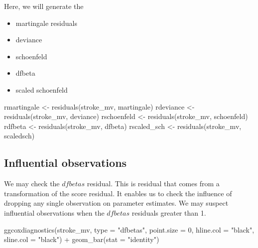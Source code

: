 \documentclass[
  10pt,
]{krantz}
\newenvironment{Shaded}{\begin{snugshade}}{\end{snugshade}}
\newcommand{\AttributeTok}[1]{\textcolor[rgb]{0.77,0.63,0.00}{#1}}
\newcommand{\DecValTok}[1]{\textcolor[rgb]{0.00,0.00,0.81}{#1}}
\newcommand{\FunctionTok}[1]{\textcolor[rgb]{0.00,0.00,0.00}{#1}}
\newcommand{\NormalTok}[1]{#1}
\newcommand{\OtherTok}[1]{\textcolor[rgb]{0.56,0.35,0.01}{#1}}
\newcommand{\SpecialCharTok}[1]{\textcolor[rgb]{0.00,0.00,0.00}{#1}}
\newcommand{\StringTok}[1]{\textcolor[rgb]{0.31,0.60,0.02}{#1}}
\providecommand{\tightlist}{%
  \setlength{\itemsep}{0pt}\setlength{\parskip}{0pt}}
\begin{document}
Here, we will generate the

\begin{itemize}
\tightlist
\item
  martingale residuals
\item
  deviance
\item
  schoenfeld
\item
  dfbeta
\item
  scaled schoenfeld
\end{itemize}

\begin{Shaded}
\begin{Highlighting}[]
\NormalTok{rmartingale }\OtherTok{\textless{}{-}} \FunctionTok{residuals}\NormalTok{(stroke\_mv, }\StringTok{\textquotesingle{}martingale\textquotesingle{}}\NormalTok{)}
\NormalTok{rdeviance }\OtherTok{\textless{}{-}} \FunctionTok{residuals}\NormalTok{(stroke\_mv, }\StringTok{\textquotesingle{}deviance\textquotesingle{}}\NormalTok{)}
\NormalTok{rschoenfeld }\OtherTok{\textless{}{-}} \FunctionTok{residuals}\NormalTok{(stroke\_mv, }\StringTok{\textquotesingle{}schoenfeld\textquotesingle{}}\NormalTok{)}
\NormalTok{rdfbeta }\OtherTok{\textless{}{-}} \FunctionTok{residuals}\NormalTok{(stroke\_mv, }\StringTok{\textquotesingle{}dfbeta\textquotesingle{}}\NormalTok{)}
\NormalTok{rscaled\_sch }\OtherTok{\textless{}{-}} \FunctionTok{residuals}\NormalTok{(stroke\_mv, }\StringTok{\textquotesingle{}scaledsch\textquotesingle{}}\NormalTok{)}
\end{Highlighting}
\end{Shaded}

\hypertarget{influential-observations}{%
\subsection{\texorpdfstring{Influential observations}{Influential observations}}\label{influential-observations}}

We may check the \(dfbetas\) residual. This is residual that comes from a transformation of the score residual. It enables us to check the influence of dropping any single observation on parameter estimates. We may suspect influential observations when the \(dfbetas\) residuals greater than 1.

\begin{Shaded}
\begin{Highlighting}[]
\FunctionTok{ggcoxdiagnostics}\NormalTok{(stroke\_mv, }
                 \AttributeTok{type =} \StringTok{"dfbetas"}\NormalTok{, }
                 \AttributeTok{point.size =} \DecValTok{0}\NormalTok{, }
                 \AttributeTok{hline.col =} \StringTok{"black"}\NormalTok{, }
                 \AttributeTok{sline.col =} \StringTok{"black"}\NormalTok{) }\SpecialCharTok{+} \FunctionTok{geom\_bar}\NormalTok{(}\AttributeTok{stat =} \StringTok{"identity"}\NormalTok{)}
\end{Highlighting}
\end{Shaded}
\end{document}
